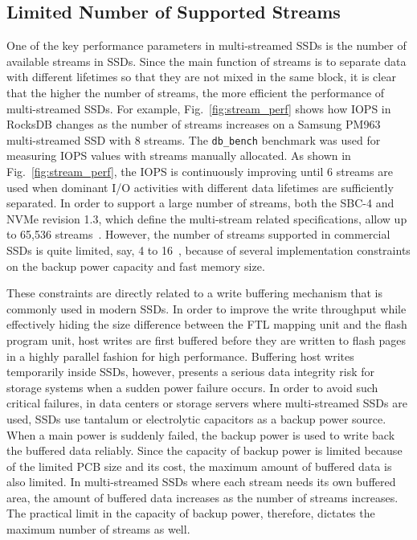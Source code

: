 \vspace{-10pt}
\subsection{Limited Number of Supported Streams}
One of the key performance parameters in multi-streamed SSDs is the number of
available streams in SSDs.  Since the main function of  streams is to separate
data with different lifetimes so that they are not mixed in the same block, it
is clear that the higher the number of streams, the more efficient the
performance of multi-streamed SSDs.  For example, Fig.~\ref{fig:stream_perf}
shows how IOPS in RocksDB changes as the number of streams increases on a
Samsung PM963 multi-streamed SSD with 8 streams.  The \texttt{db\_bench}
benchmark was used for measuring IOPS values with streams manually allocated.
As shown in Fig.~\ref{fig:stream_perf}, the IOPS is continuously improving
until 6 streams are used when dominant I/O activities with different data
lifetimes are sufficiently separated.  In order to support a large number of
streams, both the SBC-4 and NVMe revision 1.3, which define the multi-stream
related specifications, allow up to 65,536 streams~\cite{T10, NVMe}.  However,
the number of streams supported in commercial SSDs is quite limited, say, 4 to
16~\cite{MultiStream, Level, AutoStream}, because of several implementation
constraints on the backup power capacity and fast memory size.

These constraints are directly related to a write buffering mechanism that is
commonly used in modern SSDs.   In order to improve the write throughput while
effectively hiding the size difference between the FTL mapping unit and the
flash program unit, host writes are first buffered before they are written to
flash pages in a highly parallel fashion for high performance.  Buffering host
writes temporarily inside SSDs, however, presents a serious data integrity risk
for storage systems when a sudden power failure occurs.  In order to avoid such
critical failures, in data centers or storage servers where multi-streamed SSDs
are used, SSDs use tantalum or electrolytic capacitors as a backup power
source.  When a main power is suddenly failed, the backup power is used to
write back the buffered data reliably.  Since the capacity of backup power is
limited because of the limited PCB size and its cost, the maximum amount of
buffered data is also limited.  In multi-streamed SSDs where each stream needs
its own buffered area, the amount of buffered data increases as the number of
streams increases.  The practical limit in the capacity of backup power,
therefore, dictates the maximum number of streams as well.

